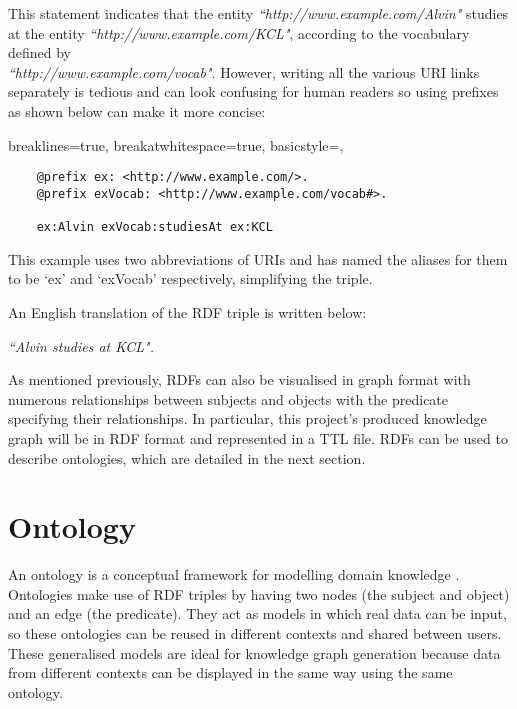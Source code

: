 This statement indicates that the entity \textit{``http://www.example.com/Alvin"} studies at the entity \textit{``http://www.example.com/KCL"}, according to the vocabulary defined by \\\textit{``http://www.example.com/vocab"}. However, writing all the various URI links separately is tedious and can look confusing for human readers so using prefixes as shown below can make it more concise:

\vspace{-0.2cm}
\lstset
{
    breaklines=true,
    breakatwhitespace=true,
    basicstyle=\linespread{1.5}\ttfamily,
}
\begin{center}
\begin{lstlisting}
    @prefix ex: <http://www.example.com/>. 
    @prefix exVocab: <http://www.example.com/vocab#>. 

    ex:Alvin exVocab:studiesAt ex:KCL
\end{lstlisting}
\end{center} 
\vspace{-0.2cm}

This example uses two abbreviations of URIs and has named the aliases for them to be `ex' and `exVocab' respectively, simplifying the triple. 

An English translation of the RDF triple is written below: 

\vspace{-0.1cm}
\begin{center}
    \textit{``Alvin studies at KCL".}
\end{center}
\vspace{-0.1cm}

As mentioned previously, RDFs can also be visualised in graph format with numerous relationships between subjects and objects with the predicate specifying their relationships. In particular, this project's produced knowledge graph will be in RDF format and represented in a TTL file. RDFs can be used to describe ontologies, which are detailed in the next section.

\section{Ontology}
\hspace{0.5cm} An ontology is a conceptual framework for modelling domain knowledge \cite{ontology}. Ontologies make use of RDF triples by having two nodes (the subject and object) and an edge (the predicate). They act as models in which real data can be input, so these ontologies can be reused in different contexts and shared between users. These generalised models are ideal for knowledge graph generation because data from different contexts can be displayed in the same way using the same ontology. 


